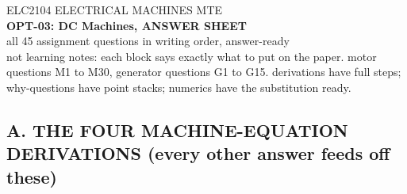 \documentclass[11pt]{article}
\begin{document}
\begin{center}
{\footnotesize\color{copper} ELC2104 \textbar{} ELECTRICAL MACHINES \textbar{} MTE}\\[6pt]
{\LARGE\bfseries\color{iron} OPT-03: DC Machines, ANSWER SHEET}\\[2pt]
{\Large\color{copper} all 45 assignment questions in writing order, answer-ready}\\[6pt]
{\footnotesize\color{muted} not learning notes: each block says exactly what to put on the paper. motor questions M1 to M30, generator questions G1 to G15. derivations have full steps; why-questions have point stacks; numerics have the substitution ready.}
\end{center}

\hrulefill
\subsection*{\color{copper}A. THE FOUR MACHINE-EQUATION DERIVATIONS (every other answer feeds off these)}
\end{document}

